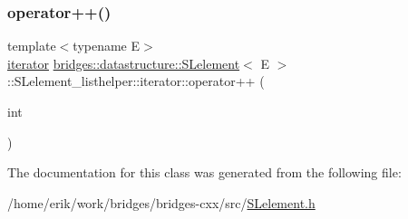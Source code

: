 \subsubsection{\texorpdfstring{operator++()}{operator++()}\hspace{0.1cm}{\footnotesize\ttfamily [2/2]}}
{\footnotesize\ttfamily template$<$typename E$>$ \\
\hyperlink{classbridges_1_1datastructure_1_1_s_lelement_1_1_s_lelement__listhelper_1_1iterator}{iterator} \hyperlink{classbridges_1_1datastructure_1_1_s_lelement}{bridges\+::datastructure\+::\+S\+Lelement}$<$ E $>$\+::S\+Lelement\+\_\+listhelper\+::iterator\+::operator++ (\begin{DoxyParamCaption}\item[{int}]{ }\end{DoxyParamCaption})\hspace{0.3cm}{\ttfamily [inline]}}



The documentation for this class was generated from the following file\+:\begin{DoxyCompactItemize}
\item 
/home/erik/work/bridges/bridges-\/cxx/src/\hyperlink{_s_lelement_8h}{S\+Lelement.\+h}\end{DoxyCompactItemize}
